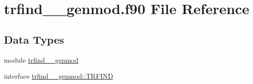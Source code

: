 \hypertarget{trfind____genmod_8f90}{\section{trfind\+\_\+\+\_\+genmod.\+f90 File Reference}
\label{trfind____genmod_8f90}
}
\subsection*{Data Types}
\begin{DoxyCompactItemize}
\item 
module \hyperlink{classtrfind____genmod}{trfind\+\_\+\+\_\+genmod}
\item 
interface \hyperlink{interfacetrfind____genmod_1_1TRFIND}{trfind\+\_\+\+\_\+genmod\+::\+T\+R\+F\+I\+N\+D}
\end{DoxyCompactItemize}
